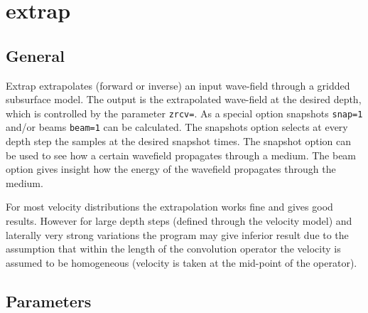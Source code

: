 \newpage
\section{extrap} \label{extrap}

\subsection{General}

Extrap extrapolates (forward or inverse) an input wave-field through a gridded subsurface model. The output is the extrapolated
wave-field at the desired depth, which is controlled by the parameter {\tt zrcv=}. As a special option snapshots {\tt snap=1} and/or beams {\tt beam=1} can be calculated. The snapshots option selects at every depth step the samples at the desired snapshot times. The snapshot option can be used to see how a certain wavefield propagates through a medium. The beam option gives insight how the energy of the wavefield propagates through the medium. 

For most velocity distributions the extrapolation works fine and gives good results. However for large depth steps (defined through the velocity model) and laterally very strong variations the program may give inferior result due to the assumption that within the length of the convolution operator the velocity is assumed to be homogeneous (velocity is taken at the mid-point of the operator). 

\subsection{Parameters}

